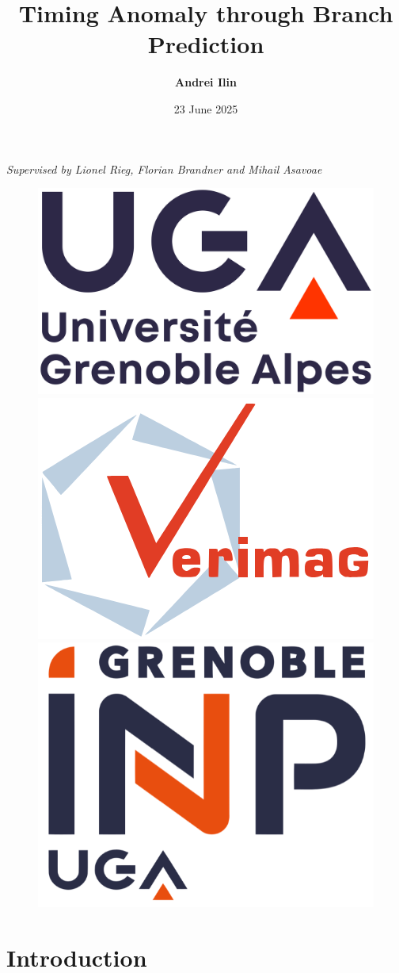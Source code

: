 \documentclass{beamer}
\author{\textbf{Andrei Ilin}}
\title{Timing Anomaly through Branch Prediction}
\subtitle{}
\institute{Université Grenoble Alpes}
\date{23 June 2025}
\begin{document}


\renewcommand{\figurename}{Fig.}

\begin{frame}
    \titlepage
    \begin{center}
        {\footnotesize \textit{Supervised by Lionel Rieg, Florian Brandner and Mihail Asavoae}}
    \end{center}
    \begin{figure}[htpb]
        \begin{center}
            \includegraphics[width=0.2\linewidth]{pic/logo-uga.png}\hspace{1.5cm}
            \includegraphics[width=0.2\linewidth]{pic/logo-verimag.png}\hspace{1.5cm}
            \includegraphics[width=0.2\linewidth]{pic/logo-INP.png}
        \end{center}
    \end{figure}
\end{frame}


\section{Introduction}
\end{document}
